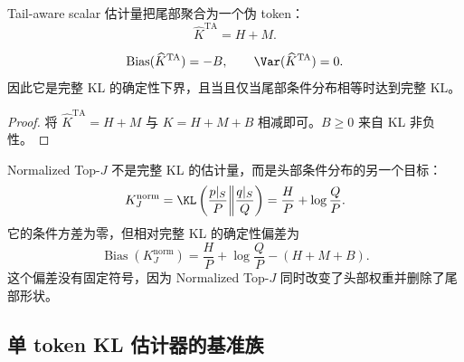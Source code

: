 Tail-aware scalar 估计量把尾部聚合为一个伪 token：
\[
 \widehat K^{\mathrm{TA}}=H+M.
\]

\begin{proposition}
\label{prop:chapter3-ta-scalar}
\[
 \operatorname{Bias}(\widehat K^{\mathrm{TA}})=-B,
 \qquad
 \Var(\widehat K^{\mathrm{TA}})=0.
\]
因此它是完整 KL 的确定性下界，且当且仅当尾部条件分布相等时达到完整 KL。
\end{proposition}

\begin{proof}
将 $\widehat K^{\mathrm{TA}}=H+M$ 与 $K=H+M+B$ 相减即可。$B\geq0$ 来自 KL 非负性。
\end{proof}

Normalized Top-$J$ 不是完整 KL 的估计量，而是头部条件分布的另一个目标：
\[
 K^{\mathrm{norm}}_J
 =\KL\left(\frac{p|_S}{P}\middle\|\frac{q|_S}{Q}\right)
 =\frac{H}{P}+\log\frac{Q}{P}.
\]
它的条件方差为零，但相对完整 KL 的确定性偏差为
\begin{equation}
 \operatorname{Bias}(K^{\mathrm{norm}}_J)
 =\frac{H}{P}+\log\frac{Q}{P}-(H+M+B).
 \label{eq:chapter3-normalized-bias}
\end{equation}
这个偏差没有固定符号，因为 Normalized Top-$J$ 同时改变了头部权重并删除了尾部形状。

\subsection{单 token KL 估计器的基准族}

